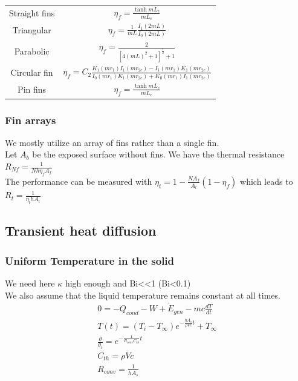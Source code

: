 \documentclass[../main.tex]{subfiles}
\begin{document}
\begin{table}[hbt!]
    \centering
    \begin{tabular}{c|c}
        Straight fins & $\eta_f = \frac{\tanh mL_c}{mL_c}$ \\
        Triangular & $\eta_f = \frac{1}{mL} \frac{I_1(2mL)}{I_0(2mL)}$\\
        Parabolic & $\eta_f = \frac{2}{[4(mL)^2 + 1]^{\frac{1}{2}}+1}$\\
        Circular fin & $\eta_f = C_2 \frac{K_1(mr_1) I_1(mr_{2c}) - I_1(mr_1) K_1(mr_{2c})}{I_0(mr_1)K_1(mr_{2c}) + K_0 (mr_1) I_1(mr_{2c})}$\\
        Pin fins & $\eta_f = \frac{\tanh mL_c}{mL_c}$\\
    \end{tabular}
\end{table}

\subsubsection{Fin arrays}
We mostly utilize an array of fins rather than a single fin.\\
Let $A_b$ be the exposed surface without fins. We have the thermal resistance $R_{Nf} = \frac{1}{Nh \eta_f A_f}$\\

The performance can be measured with $\eta_t = 1-\frac{NA_f}{A_t} (1-\eta_f)$ which leads to $R_t = \frac{1}{\eta_t h A_t}$\\

\subsection{Transient heat diffusion}

\subsubsection{Uniform Temperature in the solid}
We need here $\kappa$ high enough and Bi<<1 (Bi<0.1)\\

We also assume that the liquid temperature remains constant at all times.\\

\begin{equation}
    \begin{gathered}
        0 = -Q_{cond}-W+\dot{E}_{gen} - mc \frac{dT}{dt}\\
        T(t) = (T_i-T_\infty) e^{-\frac{hA_s}{\rho Vc}t}+ T_\infty\\
        \frac{\theta}{\theta_i} = e^{-\frac{1}{R_{conv}C_{th}}t}\\
        C_{th} = \rho Vc\\
        R_{conv} = \frac{1}{h A_s}\\
    \end{gathered}
\end{equation}
\end{document}
